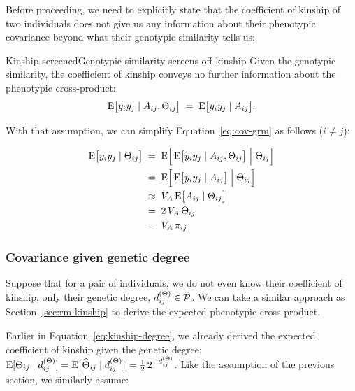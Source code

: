 \documentclass[12pt]{article}
\numberwithin{equation}{section}
\begin{document}
Before proceeding, we need to explicitly state that the coefficient of kinship of two individuals does not give us any information about their phenotypic covariance beyond what their genotypic similarity tells us:

\begin{assumption}{Kinship-screened}{Genotypic similarity screens off kinship}
Given the genotypic similarity, the coefficient of kinship conveys no further information about the phenotypic cross-product:
$$ \mathrm{E}\big[y_i y_j \mid A_{ij}, \Theta_{ij}\big] \;=\; \mathrm{E}\big[y_i y_j \mid A_{ij}\big] . $$
\end{assumption}

With that assumption, we can simplify Equation~\eqref{eq:cov-grm} as follows ($i \neq j$):

\begin{equation}\label{eq:cov-kinship}
\begin{aligned}
    \mathrm{E}\big[y_i y_j \mid \Theta_{ij}\big]
    \;&=\; \mathrm{E}\Big[\, \mathrm{E}\big[y_i y_j \mid A_{ij}, \Theta_{ij}\big] \;\Big|\; \Theta_{ij} \Big] \\
    \;&=\; \mathrm{E}\Big[\, \mathrm{E}\big[y_i y_j \mid A_{ij}\big] \;\Big|\; \Theta_{ij} \Big] \\
    \;&\approx\; V_A\, \mathrm{E}\big[A_{ij} \mid \Theta_{ij}\big] \\
    \;&=\; 2\, V_A\, \Theta_{ij} \\
    \;&=\; V_A\, \pi_{ij}
\end{aligned}
\end{equation}

\subsubsection{Covariance given genetic degree}\label{sec:rm-degree}

Suppose that for a pair of individuals, we do not even know their coefficient of kinship, only their genetic degree, $d^{(\Theta)}_{ij} \in \mathcal{P}$.
We can take a similar approach as Section~\ref{sec:rm-kinship} to derive the expected phenotypic cross-product.

Earlier in Equation~\eqref{eq:kinship-degree}, we already derived the expected coefficient of kinship given the genetic degree:
$\mathrm{E}[\Theta_{ij} \mid d^{(\Theta)}_{ij}] = \mathrm{E}\big[\widehat\Theta_{ij} \mid d^{(\Theta)}_{ij}\big] = \tfrac12\, 2^{-d^{(\Theta)}_{ij}}$.
Like the  assumption of the previous section, we similarly assume:
\end{document}
